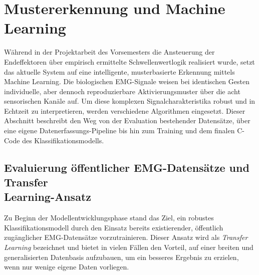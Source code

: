 \section{Mustererkennung und Machine Learning}
\label{sec:machine_learning}
Während in der Projektarbeit des Vorsemesters die Ansteuerung der Endeffektoren über empirisch ermittelte Schwellenwertlogik realisiert wurde, setzt das aktuelle System auf eine intelligente, musterbasierte Erkennung mittels Machine Learning. Die biologischen \ac{EMG}-Signale weisen bei identischen Gesten individuelle, aber dennoch reproduzierbare Aktivierungsmuster über die acht sensorischen Kanäle auf. Um diese komplexen Signalcharakteristika robust und in Echtzeit zu interpretieren, werden verschiedene Algorithmen eingesetzt. Dieser Abschnitt beschreibt den Weg von der Evaluation bestehender Datensätze, über eine eigene Datenerfassungs-Pipeline bis hin zum Training und dem finalen C-Code des Klassifikationsmodells. 
    \subsection{Evaluierung öffentlicher EMG-Datensätze und Transfer \\Learning-Ansatz}
    \label{subsec:open_source_data}
    Zu Beginn der Modellentwicklungsphase stand das Ziel, ein robustes Klassifikationsmodell durch den Einsatz bereits existierender, öffentlich zugänglicher EMG-Datensätze vorzutrainieren. Dieser Ansatz wird als \textit{Transfer Learning} bezeichnet und bietet in vielen Fällen den Vorteil, auf einer breiten und generalisierten Datenbasis aufzubauen, um ein besseres Ergebnis zu erzielen, wenn nur wenige eigene Daten vorliegen.

